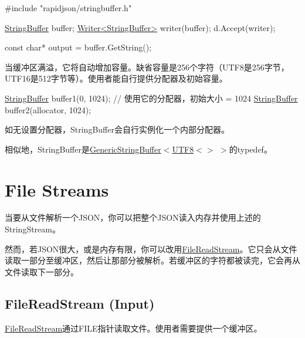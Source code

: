 \begin{DoxyCode}
\textcolor{preprocessor}{#include "rapidjson/stringbuffer.h"}

\hyperlink{class_generic_string_buffer}{StringBuffer} buffer;
\hyperlink{class_writer}{Writer<StringBuffer>} writer(buffer);
d.Accept(writer);

\textcolor{keyword}{const} \textcolor{keywordtype}{char}* output = buffer.GetString();
\end{DoxyCode}


当缓冲区满溢，它将自动增加容量。缺省容量是256个字符（\+U\+T\+F8是256字节，\+U\+T\+F16是512字节等）。使用者能自行提供分配器及初始容量。


\begin{DoxyCode}
\hyperlink{class_generic_string_buffer}{StringBuffer} buffer1(0, 1024); \textcolor{comment}{// 使用它的分配器，初始大小 = 1024}
\hyperlink{class_generic_string_buffer}{StringBuffer} buffer2(allocator, 1024);
\end{DoxyCode}


如无设置分配器，{\ttfamily String\+Buffer}会自行实例化一个内部分配器。

相似地，{\ttfamily String\+Buffer}是{\ttfamily \hyperlink{class_generic_string_buffer}{Generic\+String\+Buffer}$<$\hyperlink{struct_u_t_f8}{U\+T\+F8}$<$$>$ $>$}的typedef。\hypertarget{md_Commun_Externe_RapidJSON_doc_stream.zh-cn_FileStreams}{}\section{File Streams}\label{md_Commun_Externe_RapidJSON_doc_stream.zh-cn_FileStreams}
当要从文件解析一个\+J\+S\+O\+N，你可以把整个\+J\+S\+O\+N读入内存并使用上述的{\ttfamily String\+Stream}。

然而，若\+J\+S\+O\+N很大，或是内存有限，你可以改用{\ttfamily \hyperlink{class_file_read_stream}{File\+Read\+Stream}}。它只会从文件读取一部分至缓冲区，然后让那部分被解析。若缓冲区的字符都被读完，它会再从文件读取下一部分。\hypertarget{md_Commun_Externe_RapidJSON_doc_stream.zh-cn_FileReadStream}{}\subsection{File\+Read\+Stream (\+Input)}\label{md_Commun_Externe_RapidJSON_doc_stream.zh-cn_FileReadStream}
{\ttfamily \hyperlink{class_file_read_stream}{File\+Read\+Stream}}通过{\ttfamily F\+I\+LE}指针读取文件。使用者需要提供一个缓冲区。


